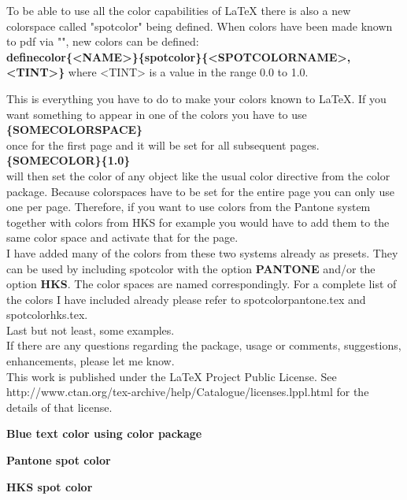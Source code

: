\documentclass{article}
\begin{document}
	To be able to use all the color capabilities of LaTeX there is also a new colorspace called "spotcolor" being defined. When colors have been made known to pdf via "\string\AddSpotColor", new colors can be defined:\\
	\textbf{definecolor\{<NAME>\}\{spotcolor\}\{<SPOTCOLORNAME>,<TINT>\}} where <TINT> is a value in the range 0.0 to 1.0.

	This is everything you have to do to make your colors known to LaTeX. If you want something to appear in one of the colors you have to use\\
	\textbf{\string\SetPageColorSpace\{SOMECOLORSPACE\}}\\
	once for the first page and it will be set for all subsequent pages.\\
	\textbf{\string\SpotColor\{SOMECOLOR\}\{1.0\}}\\
	will then set the color of any object like the usual color directive from the color package. Because colorspaces have to be set for the entire page you can only use one per page. Therefore, if you want to use colors from the Pantone system together with colors from HKS for example you would have to add them to the same color space and activate that for the page.\\
	I have added many of the colors from these two systems already as presets. They can be used by including spotcolor with the option \textbf{PANTONE} and/or the option \textbf{HKS}. The color spaces are named correspondingly. For a complete list of the colors I have included already please refer to spotcolorpantone.tex and spotcolorhks.tex.\\
	Last but not least, some examples.\\
	If there are any questions regarding the package, usage or comments, suggestions, enhancements, please let me know.\\ This work is published under the LaTeX Project Public License. See http://www.ctan.org/tex-archive/help/Catalogue/licenses.lppl.html for the details of that license.
	
	\clearpage
	\color{blue}
	\bf\Huge Blue text color using color package
	
	\clearpage
	\bf\Huge Pantone spot color
	
	\clearpage
	\bf\Huge HKS spot color
	
	\clearpage
	
\end{document}
